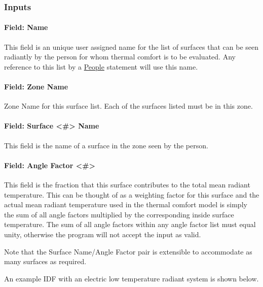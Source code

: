 \subsubsection{Inputs}\label{inputs-1-023}

\paragraph{Field: Name}\label{field-name-1-022}

This field is an unique user assigned name for the list of surfaces that can be seen radiantly by the person for whom thermal comfort is to be evaluated. Any reference to this list by a \hyperref[people]{People} statement will use this name.

\paragraph{Field: Zone Name}\label{field-zone-name-007}

Zone Name for this surface list. Each of the surfaces listed must be in this zone.

\paragraph{Field: Surface \textless{}\#\textgreater{} Name}\label{field-surface-name-002}

This field is the name of a surface in the zone seen by the person.

\paragraph{Field: Angle Factor \textless{}\#\textgreater{}}\label{field-angle-factor}

This field is the fraction that this surface contributes to the total mean radiant temperature. This can be thought of as a weighting factor for this surface and the actual mean radiant temperature used in the thermal comfort model is simply the sum of all angle factors multiplied by the corresponding inside surface temperature. The sum of all angle factors within any angle factor list must equal unity, otherwise the program will not accept the input as valid.

Note that the Surface Name/Angle Factor pair is extensible to accommodate as many
surfaces as required.

An example IDF with an electric low temperature radiant system is shown below.

